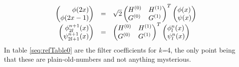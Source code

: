 \documentclass[letterpaper]{article}
\begin{document}
\begin{equation}\label{seq:refText9}
\begin{matrix}\hfill \left(\begin{matrix}\hfill \phi (2x)\\\hfill \phi
(2x-1)\end{matrix}\right)&\text{=}&\sqrt{2}\left(\begin{matrix}H^{(0)}\hfill\null &H^{(1)}\hfill\null
\\G^{(0)}\hfill\null &G^{(1)}\hfill\null \end{matrix}\right)^{T}\left(\begin{matrix}\phi (x)\hfill\null \\\psi
(x)\hfill\null \end{matrix}\right)\hfill\null \\\hfill \left(\begin{matrix}\hfill \phi _{2l}^{n+1}(x)\\\hfill \psi
_{2l+1}^{n+1}(x)\end{matrix}\right)&\text{=}&\left(\begin{matrix}H^{(0)}\hfill\null &H^{(1)}\hfill\null
\\G^{(0)}\hfill\null &G^{(1)}\hfill\null \end{matrix}\right)^{T}\left(\begin{matrix}\phi _{l}^{n}(x)\hfill\null \\\psi
_{l}^{n}(x)\hfill\null \end{matrix}\right)\hfill\null \end{matrix}
\end{equation}
In table \ref{seq:refTable0} are the filter coefficients for \textit{k=}4, the only point being that these are
plain-old-numbers and not anything mysterious.
\end{document}
